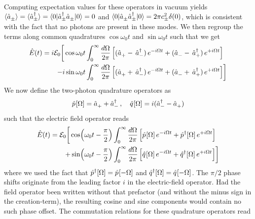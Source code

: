 Computing expectation values for these operators in vacuum yields $\langle \hat{a}^{\vphantom{\dagger}}_{ \pm} \rangle = \langle \hat{a}^{\dagger}_{ \pm}\rangle = \langle 0 | \hat{a}^{\dagger}_{\pm} \hat{a}^{\vphantom{\dagger}}_{\pm} | 0 \rangle = 0$ and $\langle 0 | \hat{a}^{\vphantom{\dagger}}_{\pm} \hat{a}^{\dagger}_{\pm} | 0 \rangle = 2 \pi c_\pm^2 \delta(0)$, which is consistent with the fact that no photons are present in these modes. We then regroup the terms along common quadratures $\cos \omega_0 t$ and $\sin \omega_0 t$ such that we get
\begin{equation*}
  \begin{split}
   \hat{E}(t) = i  \mathcal{E}_0 \bigg[ \cos \omega_0 t  \int^{\infty}_0 \dfrac{d\Omega}{2\pi} \, \Big[& (\hat{a}_+^{\vphantom{\dagger}} - \, \hat{a}_-^{\dagger})\,e^{-i\Omega t} + (\hat{a}_-^{\vphantom{\dagger}} - \, \hat{a}_+^{\dagger})\,e^{+i \Omega t} \Big] \\ 
    - i   \sin \omega_0 t  \int^{\infty}_0 \dfrac{d\Omega}{2\pi} \, \Big[&(\hat{a}_+^{\vphantom{\dagger}} + \, \hat{a}_-^{\dagger})\,e^{-i\Omega t} + (\hat{a}_-^{\vphantom{\dagger}} + \, \hat{a}_+^{\dagger})\,e^{+i \Omega t} \Big] \bigg] 
  \end{split}
\end{equation*}
We now define the two-photon quadrature operators as
\[\hat{p}^{\vphantom{\dagger}}[\Omega] = \hat{a}_+^{\vphantom{\dagger}} + \hat{a}_-^{\dagger} \,, \quad \hat{q}^{\vphantom{\dagger}}[\Omega] = i(\hat{a}_-^{\dagger} - \hat{a}_+^{\vphantom{\dagger}} )\]
such that the electric field operator reads
\begin{equation}
  \begin{split}
   \hat{E}(t) = \mathcal{E}_0 \bigg[  \cos ( \omega_0 t - \dfrac{\pi}{2}) \int^{\infty}_0 \dfrac{d\Omega}{2\pi} \, \Big[& \hat{p}^{\vphantom{\dagger}}[\Omega] \,e^{-i\Omega t} +\hat{p}^{\dagger}[\Omega] \,e^{+i \Omega t} \Big] \\ 
    +  \sin ( \omega_0 t - \dfrac{\pi}{2})  \int^{\infty}_0 \dfrac{d\Omega}{2\pi} \, \Big[&\hat{q}^{\vphantom{\dagger}}[\Omega]\,e^{-i\Omega t} + \hat{q}^{\dagger}[\Omega]\,e^{+i \Omega t} \Big] \bigg] 
  \end{split}
\end{equation}
where we used the fact that $\hat{p}^\dagger[\Omega] = \hat{p}^{\vphantom{\dagger}}[-\Omega]$ and $\hat{q}^\dagger[\Omega] = \hat{q}^{\vphantom{\dagger}}[-\Omega]$. The $\pi/2$ phase shifts originate from the leading factor $i$ in the electric-field operator. Had the field operator been written without that prefactor (and without the minus sign in the creation-term), the resulting cosine and sine components would contain no such phase offset. The commutation relations for these quadrature operators read
